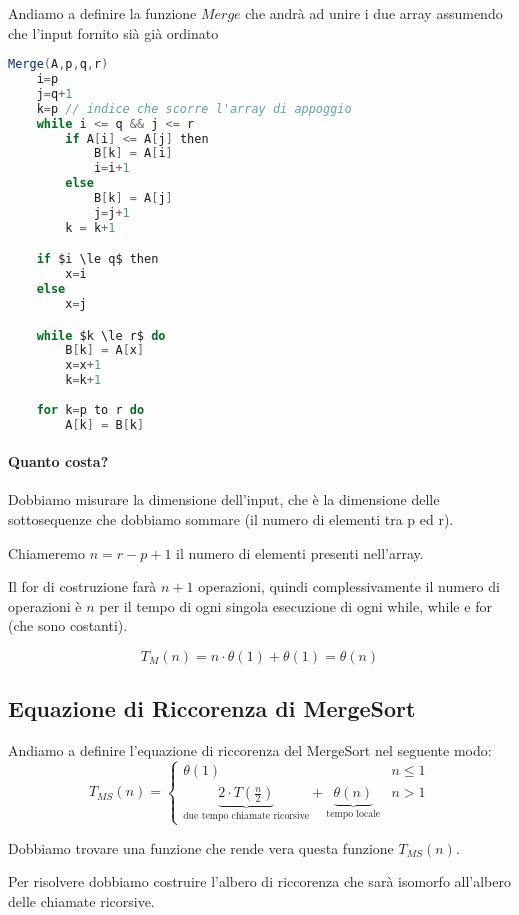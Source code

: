 Andiamo a definire la funzione $Merge$ che andrà ad unire i due array assumendo che l'input fornito sià già ordinato

\begin{lstlisting}[language=Java]
Merge(A,p,q,r)
    i=p
    j=q+1
    k=p // indice che scorre l'array di appoggio
    while i <= q && j <= r
        if A[i] <= A[j] then
            B[k] = A[i]
            i=i+1
        else
            B[k] = A[j]
            j=j+1
        k = k+1

    if $i \le q$ then
        x=i
    else
        x=j

    while $k \le r$ do
        B[k] = A[x]
        x=x+1
        k=k+1
        
    for k=p to r do
        A[k] = B[k]
\end{lstlisting}

\paragraph{Quanto costa?} Dobbiamo misurare la dimensione dell'input, che è la dimensione delle sottosequenze che dobbiamo sommare (il numero di elementi tra p ed r). \smallskip

Chiameremo $n = r-p+1$ il numero di elementi presenti nell'array.\smallskip

Il for di costruzione farà $n+1$ operazioni, quindi complessivamente il numero di operazioni è $n$ per il tempo di ogni singola esecuzione di ogni while, while e for (che sono costanti).

$$T_{M}(n) = n\cdot \theta(1) + \theta(1) = \theta(n)$$

\subsection{Equazione di Riccorenza di MergeSort}
Andiamo a definire l'equazione di riccorenza del MergeSort nel seguente modo:
$$T_{MS}(n)= \left\{ \begin{array}{rcl}
    \theta(1) &  n\le1\\
    \underbrace{2 \cdot T(\frac{n}{2})}_{\text{due tempo chiamate ricorsive}}+\underbrace{\theta(n)}_{\text{tempo locale}} & n>1
    \end{array}\right.$$

Dobbiamo trovare una funzione che rende vera questa funzione $T_{MS}(n)$. \smallskip

Per risolvere dobbiamo costruire l'albero di riccorenza che sarà isomorfo all'albero delle chiamate ricorsive. \smallskip


